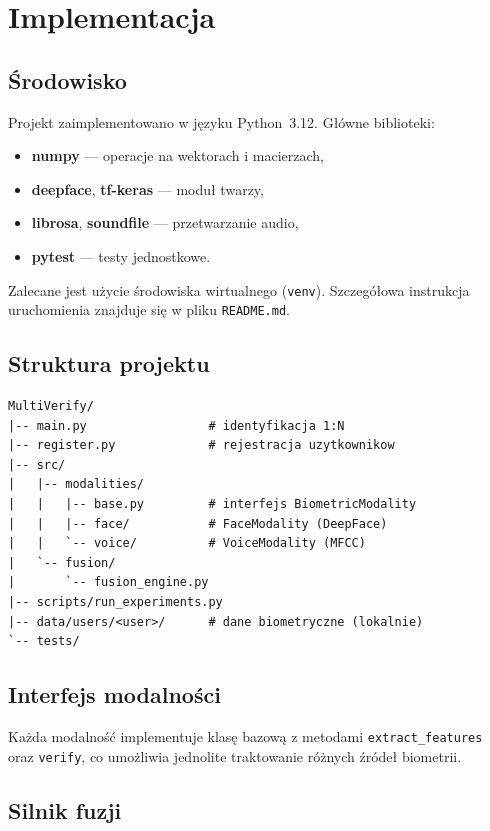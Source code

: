 \chapter{Implementacja}
\label{cha:implementacja}

\section{Środowisko}

Projekt zaimplementowano w języku Python~3.12. Główne biblioteki:
\begin{itemize}
    \item \textbf{numpy} --- operacje na wektorach i macierzach,
    \item \textbf{deepface}, \textbf{tf-keras} --- moduł twarzy,
    \item \textbf{librosa}, \textbf{soundfile} --- przetwarzanie audio,
    \item \textbf{pytest} --- testy jednostkowe.
\end{itemize}

Zalecane jest użycie środowiska wirtualnego (\texttt{venv}). Szczegółowa instrukcja uruchomienia znajduje się w pliku \texttt{README.md}.

\section{Struktura projektu}

\begin{verbatim}
MultiVerify/
|-- main.py                 # identyfikacja 1:N
|-- register.py             # rejestracja uzytkownikow
|-- src/
|   |-- modalities/
|   |   |-- base.py         # interfejs BiometricModality
|   |   |-- face/           # FaceModality (DeepFace)
|   |   `-- voice/          # VoiceModality (MFCC)
|   `-- fusion/
|       `-- fusion_engine.py
|-- scripts/run_experiments.py
|-- data/users/<user>/      # dane biometryczne (lokalnie)
`-- tests/
\end{verbatim}

\section{Interfejs modalności}

Każda modalność implementuje klasę bazową z metodami \texttt{extract\_features} oraz \texttt{verify}, co umożliwia jednolite traktowanie różnych źródeł biometrii.

\section{Silnik fuzji}

